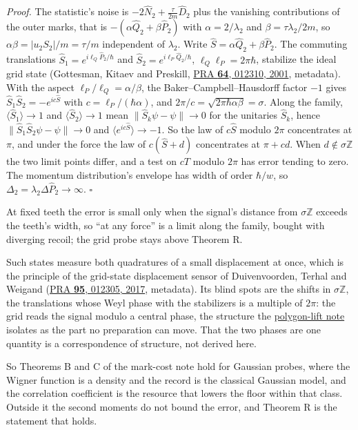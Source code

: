 \documentclass[11pt,a4paper]{article}
\begin{document}
\emph{Proof.} The statistic's noise is
\(-2\hat N_2+\frac{\tau}{2m}\hat D_2\) plus the vanishing contributions
of the outer marks, that is \(-(\alpha\hat Q_2+\beta\hat P_2)\) with
\(\alpha=2/\lambda_2\) and \(\beta=\tau\lambda_2/2m\), so
\(\alpha\beta=|u_2S_2|/m=\tau/m\) independent of \(\lambda_2\). Write
\(\hat S=\alpha\hat Q_2+\beta\hat P_2\). The commuting translations
\(\hat S_1=e^{i\ell_Q\hat P_2/\hbar}\) and
\(\hat S_2=e^{i\ell_P\hat Q_2/\hbar}\), \(\ell_Q\ell_P=2\pi\hbar\),
stabilize the ideal grid state (Gottesman, Kitaev and Preskill,
\href{https://doi.org/10.1103/PhysRevA.64.012310}{PRA \textbf{64},
012310, 2001}, metadata). With the aspect
\(\ell_P/\ell_Q=\alpha/\beta\), the Baker--Campbell--Hausdorff factor
\(-1\) gives \(\hat S_1\hat S_2=-e^{ic\hat S}\) with
\(c=\ell_P/(\hbar\alpha)\), and
\(2\pi/c=\sqrt{2\pi\hbar\alpha\beta}=\sigma\). Along the family,
\(\langle\hat S_1\rangle\to1\) and \(\langle\hat S_2\rangle\to1\) mean
\(\|\hat S_k\psi-\psi\|\to0\) for the unitaries \(\hat S_k\), hence
\(\|\hat S_1\hat S_2\psi-\psi\|\to0\) and
\(\langle e^{ic\hat S}\rangle\to-1\). So the law of \(c\hat S\) modulo
\(2\pi\) concentrates at \(\pi\), and under the force the law of
\(c(\hat S+d)\) concentrates at \(\pi+cd\). When
\(d\notin\sigma\mathbb Z\) the two limit points differ, and a test on
\(cT\) modulo \(2\pi\) has error tending to zero. The momentum
distribution's envelope has width of order \(\hbar/w\), so
\(\Delta_2=\lambda_2\Delta\hat P_2\to\infty\). \(\square\)

At fixed teeth the error is small only when the signal's distance from
\(\sigma\mathbb Z\) exceeds the teeth's width, so ``at any force'' is a
limit along the family, bought with diverging recoil; the grid probe
stays above Theorem R.

Such states measure both quadratures of a small displacement at once,
which is the principle of the grid-state displacement sensor of
Duivenvoorden, Terhal and Weigand
(\href{https://doi.org/10.1103/PhysRevA.95.012305}{PRA \textbf{95},
012305, 2017}, metadata). Its blind spots are the shifts in
\(\sigma\mathbb Z\), the translations whose Weyl phase with the
stabilizers is a multiple of \(2\pi\): the grid reads the signal modulo
a central phase, the structure the
\href{polygon-lift-phase.md}{polygon-lift note} isolates as the part no
preparation can move. That the two phases are one quantity is a
correspondence of structure, not derived here.

So Theorems B and C of the mark-cost note hold for Gaussian probes,
where the Wigner function is a density and the record is the classical
Gaussian model, and the correlation coefficient is the resource that
lowers the floor within that class. Outside it the second moments do not
bound the error, and Theorem R is the statement that holds.
\end{document}
